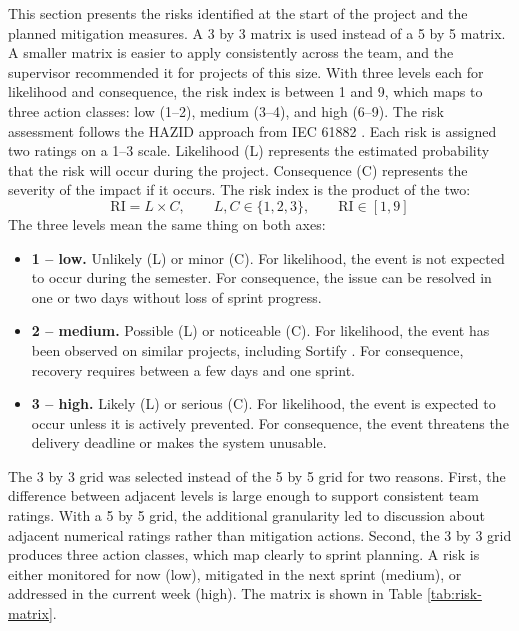 \label{sec:risk-management}
This section presents the risks identified at the start of the project
and the planned mitigation measures. A 3 by 3 matrix is used instead of
a 5 by 5 matrix. A smaller matrix is easier to apply consistently across
the team, and the supervisor recommended it for projects of this size.
With three levels each for likelihood and consequence, the risk index is
between 1 and 9, which maps to three action classes: low (1--2), medium
(3--4), and high (6--9).
The risk assessment follows the HAZID approach from IEC 61882
\cite{hazid}. Each risk is assigned two ratings on a 1--3 scale.
Likelihood (L) represents the estimated probability that the risk will
occur during the project. Consequence (C) represents the severity of the
impact if it occurs. The risk index is the product of the two:
\[
\text{RI} = L \times C, \qquad L, C \in \{1, 2, 3\}, \qquad \text{RI} \in [1, 9]
\]
The three levels mean the same thing on both axes:
\begin{itemize}
\item \textbf{1 -- low.} Unlikely (L) or minor (C). For likelihood,
the event is not expected to occur during the semester. For consequence,
the issue can be resolved in one or two days without loss of sprint
progress.
\item \textbf{2 -- medium.} Possible (L) or noticeable (C). For
likelihood, the event has been observed on similar projects, including
Sortify \cite{sortify}. For consequence, recovery requires between a few
days and one sprint.
\item \textbf{3 -- high.} Likely (L) or serious (C). For likelihood,
the event is expected to occur unless it is actively prevented. For
consequence, the event threatens the delivery deadline or makes the
system unusable.
\end{itemize}
The 3 by 3 grid was selected instead of the 5 by 5 grid for two reasons.
First, the difference between adjacent levels is large enough to support
consistent team ratings. With a 5 by 5 grid, the additional granularity
led to discussion about adjacent numerical ratings rather than
mitigation actions. Second, the 3 by 3 grid produces three action
classes, which map clearly to sprint planning. A risk is either monitored
for now (low), mitigated in the next sprint (medium), or addressed in
the current week (high). The matrix is shown in Table
\ref{tab:risk-matrix}.
